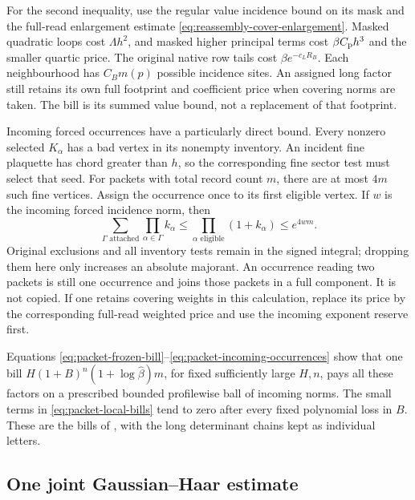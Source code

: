 \documentclass[11pt,reqno]{amsart}
\numberwithin{equation}{section}
\theoremstyle{definition}
\theoremstyle{remark}
\begin{document}
For the second inequality, use the regular value incidence
bound on its mask and the full-read enlargement estimate
\eqref{eq:reassembly-cover-enlargement}. Masked quadratic loops
cost \(\Lambda h^2\), and masked higher principal terms cost
\(\beta C_{\rm p}h^3\) and the smaller quartic price.
The original native row tails cost \(\beta e^{-c_LR_B}\).
Each neighbourhood has \(C_Bm(p)\) possible incidence sites.
An assigned long factor still retains its own full footprint
and coefficient price when covering norms are taken. The bill
is its summed value bound, not a replacement of that footprint.

Incoming forced occurrences have a particularly direct bound.
Every nonzero selected \(K_\alpha\) has a bad vertex in its
nonempty inventory. An incident fine plaquette has chord
greater than \(h\), so the corresponding fine sector test
must select that seed. For packets with total record count
\(m\), there are at most \(4m\) such fine vertices.
Assign the occurrence once to its first eligible vertex.
If \(w\) is the incoming forced incidence norm, then
\begin{equation}
 \sum_{\Gamma\text{ attached}}\prod_{\alpha\in\Gamma}k_\alpha
 \le\prod_{\alpha\text{ eligible}}(1+k_\alpha)
                                                        \le e^{4wm}.
 \label{eq:packet-incoming-occurrences}
\end{equation}
Original exclusions and all inventory tests remain in the signed
integral; dropping them here only increases an absolute majorant.
An occurrence reading two packets is still one occurrence and
joins those packets in a full component. It is not copied.
If one retains covering weights in this calculation, replace
its price by the corresponding full-read weighted price and
use the incoming exponent reserve first.

Equations \eqref{eq:packet-frozen-bill}--\eqref{eq:packet-incoming-occurrences}
show that one bill
\(H(1+B)^n(1+\log\widehat\beta)m\), for fixed sufficiently
large \(H,n\), pays all these factors on a prescribed bounded
profilewise ball of incoming norms. The small terms in
\eqref{eq:packet-local-bills} tend to zero after every fixed
polynomial loss in \(B\). These are the bills of
\cite[Lemmas~30.1--30.2, pp.~168--170]{Main}, with the long
determinant chains kept as individual letters.

\subsection{One joint Gaussian--Haar estimate}
\end{document}
